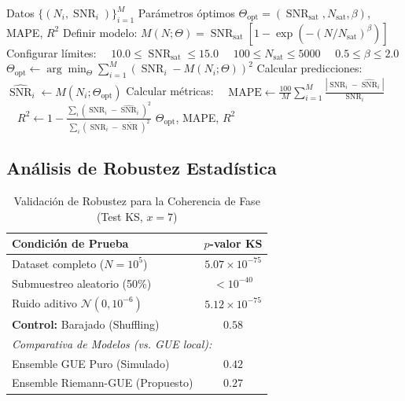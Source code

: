 \documentclass[12pt, a4paper]{article}
\theoremstyle{plain}
\theoremstyle{definition}
\theoremstyle{remark}
\newcommand{\SNR}{\operatorname{SNR}}
\begin{document}
\begin{algorithm}[H]
\caption{Ajuste Robusto de la Dinámica del SNR}
\label{alg:ajuste_snr_detalle}
\begin{algorithmic}[1]
\Require Datos $\{(N_i, \SNR_i)\}_{i=1}^M$
\Ensure Parámetros óptimos $\Theta_{\text{opt}} = (\SNR_{\text{sat}}, N_{\text{sat}}, \beta)$, MAPE, $R^2$
\State Definir modelo: $M(N; \Theta) = \SNR_{\text{sat}} [1 - \exp(-(N/N_{\text{sat}})^\beta)]$
\State Configurar límites:
    \State $\quad 10.0 \leq \SNR_{\text{sat}} \leq 15.0$
    \State $\quad 100 \leq N_{\text{sat}} \leq 5000$
    \State $\quad 0.5 \leq \beta \leq 2.0$
\State $\Theta_{\text{opt}} \gets \arg\min_{\Theta} \sum_{i=1}^M \left( \SNR_i - M(N_i; \Theta) \right)^2$ 
\State Calcular predicciones: $\widehat{\SNR}_i \gets M(N_i; \Theta_{\text{opt}})$
\State Calcular métricas:
\State $\quad \text{MAPE} \gets \frac{100}{M} \sum_{i=1}^M \frac{|\SNR_i - \widehat{\SNR}_i|}{\SNR_i}$ 
\State $\quad R^2 \gets 1 - \frac{\sum_i (\SNR_i - \widehat{\SNR}_i)^2}{\sum_i (\SNR_i - \bar{\SNR})^2}$ 
\State \Return $\Theta_{\text{opt}}$, MAPE, $R^2$
\end{algorithmic}
\end{algorithm}

\subsection{Análisis de Robustez Estadística}
\label{ap:robustez}

\begin{table}[H]
\centering
\caption{Validación de Robustez para la Coherencia de Fase (Test KS, $x=7$)}
\label{tab:robustez}
\begin{tabular}{@{}lc@{}}
\toprule
\textbf{Condición de Prueba} & \textbf{$p$-valor KS} \\
\midrule
Dataset completo ($N=10^5$) & $5.07 \times 10^{-75}$ \\
Submuestreo aleatorio (50\%) & $< 10^{-40}$ \\
Ruido aditivo $\mathcal{N}(0, 10^{-6})$ & $5.12 \times 10^{-75}$ \\
\textbf{Control:} Barajado (Shuffling) & $0.58$ \\
\midrule
\multicolumn{2}{l}{\textit{Comparativa de Modelos (vs. GUE local):}} \\
Ensemble GUE Puro (Simulado) & $0.42$ \\
Ensemble Riemann-GUE (Propuesto) & $\mathbf{0.27}$ \\
\bottomrule
\end{tabular}
\end{table}
\end{document}
